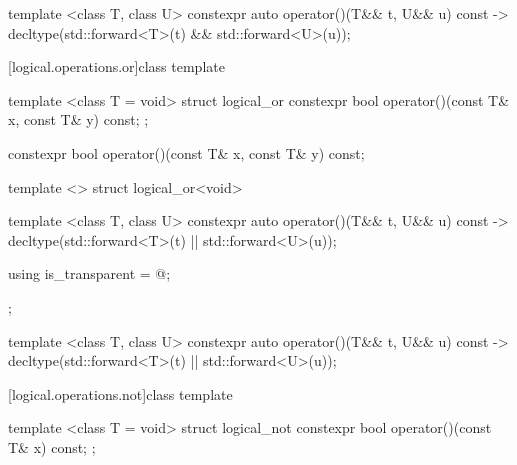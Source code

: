 %
\begin{itemdecl}
template <class T, class U> constexpr auto operator()(T&& t, U&& u) const
    -> decltype(std::forward<T>(t) && std::forward<U>(u));
\end{itemdecl}

\begin{itemdescr}
\pnum\returns {}
\end{itemdescr}

[logical.operations.or]{class template }

%
\begin{itemdecl}
template <class T = void> struct logical_or {
  constexpr bool operator()(const T& x, const T& y) const;
};
\end{itemdecl}

%
\begin{itemdecl}
constexpr bool operator()(const T& x, const T& y) const;
\end{itemdecl}

\begin{itemdescr}
\pnum\returns {}
\end{itemdescr}

%
\begin{itemdecl}
template <> struct logical_or<void> {
  template <class T, class U> constexpr auto operator()(T&& t, U&& u) const
    -> decltype(std::forward<T>(t) || std::forward<U>(u));

  using is_transparent = @\unspec@;
};
\end{itemdecl}

%
\begin{itemdecl}
template <class T, class U> constexpr auto operator()(T&& t, U&& u) const
    -> decltype(std::forward<T>(t) || std::forward<U>(u));
\end{itemdecl}

\begin{itemdescr}
\pnum\returns {}
\end{itemdescr}

[logical.operations.not]{class template }

%
\begin{itemdecl}
template <class T = void> struct logical_not {
  constexpr bool operator()(const T& x) const;
};
\end{itemdecl}

